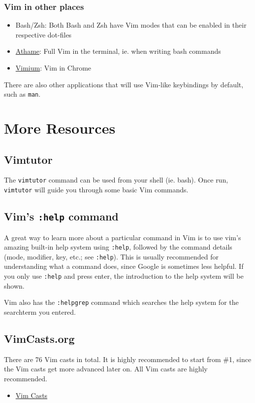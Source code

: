 \documentclass[11pt]{article}
\begin{document}
\subsubsection{Vim in other places}
\label{sec:org16058f8}
\begin{itemize}
\item Bash/Zsh: Both Bash and Zsh have Vim modes that can be enabled in their respective dot-files
\item \href{https://github.com/ardagnir/athame}{Athame}: Full Vim in the terminal, ie. when writing bash commands
\item \href{https://chrome.google.com/webstore/detail/vimium/dbepggeogbaibhgnhhndojpepiihcmeb}{Vimium}: Vim in Chrome
\end{itemize}

There are also other applications that will use Vim-like keybindings by default,
such as \texttt{man}.
\section{More Resources}
\label{sec:org1e99aa8}
\subsection{Vimtutor}
\label{sec:org24c0a42}
The \texttt{vimtutor} command can be used from your shell (ie. bash). Once run,
\texttt{vimtutor} will guide you through some basic Vim commands.
\subsection{Vim's \texttt{:help} command}
\label{sec:org2ad77ca}
A great way to learn more about a particular command in Vim is to use vim's
amazing built-in help system using \texttt{:help}, followed by the command details
(mode, modifier, key, etc.; see \texttt{:help}). This is usually recommended for
understanding what a command does, since Google is sometimes less helpful.
If you only use \texttt{:help} and press enter, the introduction to the help system
will be shown.

Vim also has the \texttt{:helpgrep} command which searches the help system for the
searchterm you entered.
\subsection{VimCasts.org}
\label{sec:orgb5c2a9e}
There are 76 Vim casts in total. It is highly recommended to start from \#1,
since the Vim casts get more advanced later on. All Vim casts are highly
recommended.
\begin{itemize}
\item \href{http://vimcasts.org/episodes/page/8/}{Vim Casts}
\end{itemize}
\end{document}
